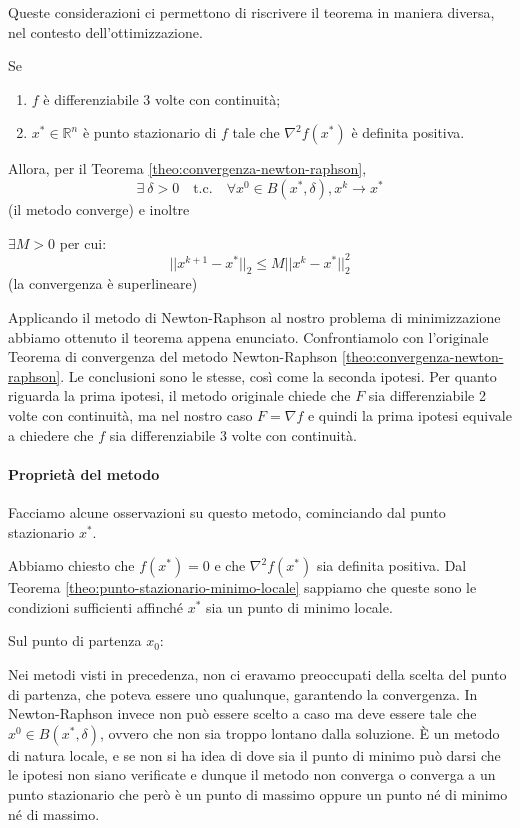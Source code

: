 Queste considerazioni ci permettono di riscrivere il teorema in
maniera diversa, nel contesto dell'ottimizzazione.

\begin{theo}
\label{theo:convergenza-newton-raphson-ottimizzazione} Se
\begin{enumerate}
\item $f$ \`e differenziabile 3 volte con continuit\`a;
\item $x^{*} \in \mathbb{R}^{n}$ \`e punto stazionario di $f$ tale che
$\nabla^{2} f(x^{*})$ \`e definita positiva.
\end{enumerate} Allora, per il Teorema
\ref{theo:convergenza-newton-raphson},
$$\exists~ \delta > 0 \quad \text{t.c.}\quad \forall x^{0} \in B(x^{*},\delta), x^{k} \rightarrow x^{*}$$
(il metodo converge) e inoltre

$\exists M > 0 $ per cui:
$$|| x^{k+1} -x^{*}||_{2} \leq M ||x^{k} - x^{*}||_{2}^{2}$$
(la convergenza è superlineare)
\end{theo}

Applicando il metodo di Newton-Raphson al nostro problema di
minimizzazione abbiamo ottenuto il teorema appena
enunciato. Confrontiamolo con l'originale Teorema di convergenza del
metodo Newton-Raphson \ref{theo:convergenza-newton-raphson}. Le
conclusioni sono le stesse, così come la seconda ipotesi. Per quanto
riguarda la prima ipotesi, il metodo originale chiede che $F$ sia
differenziabile 2 volte con continuit\`a, ma nel nostro caso $F=\nabla
f$ e quindi la prima ipotesi equivale a chiedere che $f$ sia
differenziabile 3 volte con continuit\`a.

\paragraph{Propriet\`a del metodo} Facciamo alcune osservazioni su
questo metodo, cominciando dal punto stazionario $x^*$.
\begin{observation} Abbiamo chiesto che $f(x^*)=0$ e che $\nabla^2 f
(x^*)$ sia definita positiva. Dal Teorema
\ref{theo:punto-stazionario-minimo-locale} sappiamo che queste sono le
condizioni sufficienti affinché $x^*$ sia un punto di minimo locale.
\end{observation}

Sul punto di partenza $x_0$:
\begin{observation} Nei metodi visti in precedenza, non ci eravamo
preoccupati della scelta del punto di partenza, che poteva essere uno
qualunque, garantendo la convergenza. In Newton-Raphson invece non può
essere scelto a caso ma deve essere tale che $x^{0} \in
B(x^{*},\delta)$, ovvero che non sia troppo lontano dalla soluzione. \`E
un metodo di natura locale, e se non si ha idea di dove sia il punto
di minimo può darsi che le ipotesi non siano verificate e dunque il
metodo non converga o converga a un punto stazionario che però \`e un
punto di massimo oppure un punto né di minimo né di massimo.
\end{observation}

